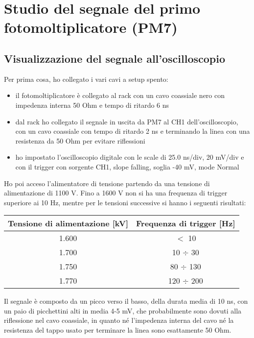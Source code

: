 \documentclass{article}
\begin{document}
\section{Studio del segnale del primo fotomoltiplicatore (PM7)}
\subsection{Visualizzazione del segnale all'oscilloscopio}
Per prima cosa, ho collegato i vari cavi a setup spento: 
\begin{itemize}
    \item il fotomoltiplicatore è collegato al rack con un cavo coassiale nero con impedenza interna 50 Ohm e tempo di ritardo 6 ns
    \item dal rack ho collegato il segnale in uscita da PM7 al CH1 dell'oscilloscopio, con un cavo coassiale con tempo di ritardo 2 ns e terminando la linea con una resistenza da 50 Ohm per evitare riflessioni
    \item ho impostato l'oscilloscopio digitale con le scale di 25.0 ns/div, 20 mV/div e con il trigger con sorgente CH1, slope falling, soglia -40 mV, mode Normal
\end{itemize}
Ho poi acceso l'alimentatore di tensione partendo da una tensione di alimentazione di 1100 V. Fino a 1600 V non si ha una frequenza di trigger superiore ai 10 Hz, mentre per le tensioni successive si hanno i seguenti risultati: 

\begin{center}
\begin{tabular}{|c|c|}
\hline
Tensione di alimentazione [kV] & Frequenza di trigger [Hz]\\
\hline
     1.600 & $<$ 10   \\
    1.700 & 10 $\div$ 30\\
    1.750  & 80 $\div$ 130\\
    1.770  & 120 $\div$ 200\\
    \hline
\end{tabular}
\end{center}
Il segnale è composto da un picco verso il basso, della durata media di 10 ns, con un paio di picchettini alti in media 4-5 mV, che probabilmente sono dovuti alla riflessione nel cavo coassiale, in quanto né l'impedenza interna del cavo né la resistenza del tappo usato per terminare la linea sono esattamente 50 Ohm.
\end{document}
